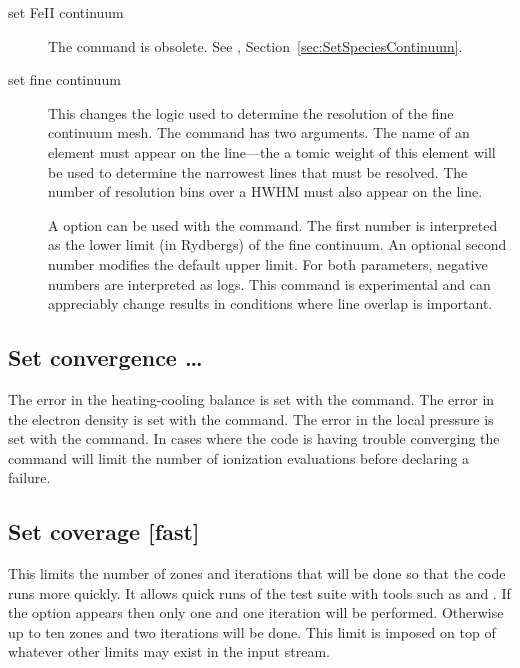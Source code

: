 \begin{description}
\item[set FeII continuum]
The command is obsolete.
See , Section~\ref{sec:SetSpeciesContinuum}.

\label{sec:CommandSetFineContinuum}
\item[set fine continuum]  This changes the logic used
to determine the
resolution of the fine continuum mesh.
The command has two arguments.
The name of an element must appear on the line---the a
tomic weight of this
element will be used to determine the narrowest lines
that must be resolved.
The number of resolution bins over a HWHM must also
appear on the line.

\begin{shaded}
A  option can be used with the
 command.  The first number is
interpreted as the lower limit (in Rydbergs) of the fine continuum.
An optional second number modifies the default upper limit.  For both
parameters, negative numbers are interpreted as logs.
This command is experimental
and can appreciably change results in conditions where line overlap
is important.
\end{shaded}

\end{description}

\subsection{Set convergence \dots}

The error in the heating-cooling balance is set
with the  command.
The error in the electron
density is set with the  command.
The error in the local pressure is set with the
 command.
In cases where the code
is having trouble converging the  command
will limit the number of ionization evaluations before declaring
a failure.

\subsection{Set coverage [fast]}

This limits the number of zones and iterations that will be done so that
the code runs more quickly.
It allows quick runs of the test suite with
tools such as  and .
If the  option appears then only
one and one iteration will be performed.
Otherwise up to ten zones and
two iterations will be done.
This limit is imposed on top of whatever other
limits may exist in the input stream.

